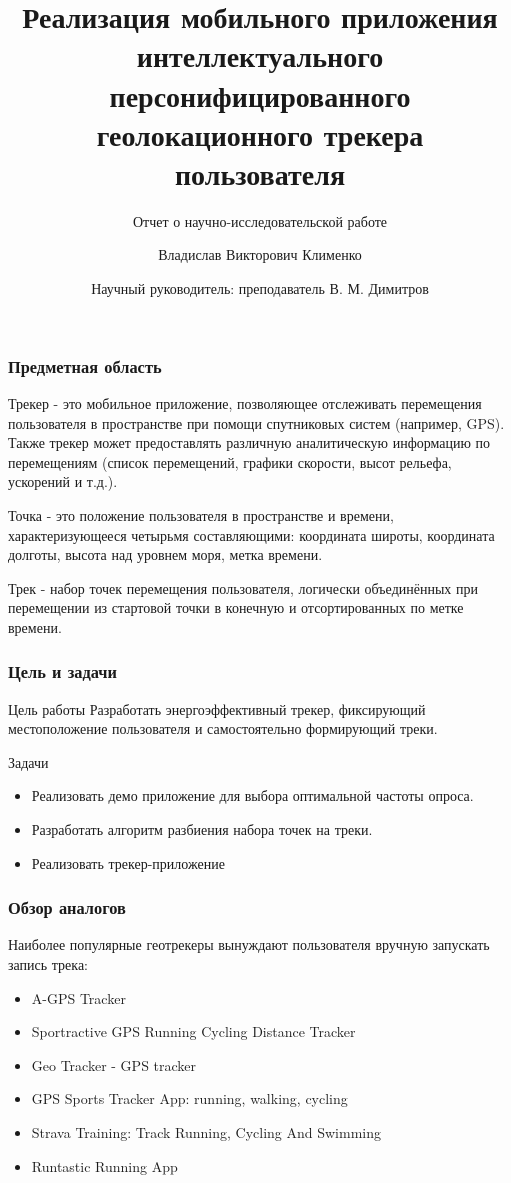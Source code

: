 \documentclass[hyperref={unicode}]{beamer}
\title[%
    Бобры и Интернет
]{%
	Реализация мобильного приложения \\
	интеллектуального персонифицированного\\
	геолокационного трекера пользователя
}
\subtitle{Отчет о научно-исследовательской работе}
\author[%
    Владислав Клименко
]{%
    Владислав Викторович Клименко
}
\date[%
    01.06.2018
]{%
    Научный руководитель: преподаватель  В. М. Димитров
}
\institute[%
    ПетрГУ
]{%
    Петрозаводский государственный университет\\
    Кафедра информатики и математического обеспечения
}
\begin{document}
\begin{frame}
\maketitle
\end{frame}

\begin{frame}
  \frametitle{Предметная область}
  Трекер - это мобильное приложение, позволяющее отслеживать перемещения пользователя в пространстве при помощи спутниковых систем (например, GPS). Также трекер может предоставлять различную аналитическую информацию по перемещениям (список перемещений, графики скорости, высот рельефа, ускорений и т.д.).
  
  Точка - это положение пользователя в пространстве и времени, характеризующееся четырьмя составляющими: координата широты, координата долготы, высота над уровнем моря, метка времени.
  
  Трек - набор точек перемещения пользователя, логически объединённых при перемещении из стартовой точки в конечную и отсортированных по метке времени.
\end{frame}

\begin{frame}
  \frametitle{Цель и задачи}
  \begin{block}{Цель работы}
   Разработать энергоэффективный трекер, фиксирующий местоположение пользователя и самостоятельно формирующий треки.
  \end{block}
  \begin{block}{Задачи}
  \begin{itemize}
  	\item Реализовать демо приложение для выбора оптимальной частоты опроса.
  	\item Разработать алгоритм разбиения набора точек на треки.
  	\item Реализовать трекер-приложение
  \end{itemize}
  \end{block}
\end{frame}

\begin{frame}
\frametitle{Обзор аналогов}
Наиболее популярные геотрекеры вынуждают пользователя вручную запускать запись трека:
\begin{itemize}
	\item A-GPS Tracker
	\item Sportractive GPS Running Cycling Distance Tracker
	\item Geo Tracker - GPS tracker
	\item GPS Sports Tracker App: running, walking, cycling
	\item Strava Training: Track Running, Cycling And Swimming
	\item Runtastic Running App
\end{itemize}
\end{frame}
\end{document}
